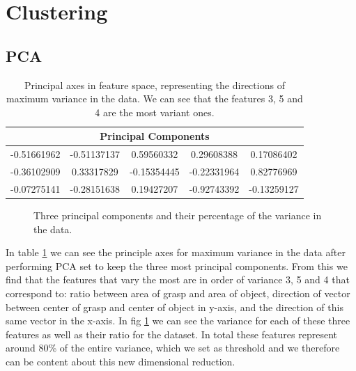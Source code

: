 %

\section{Clustering}

\subsection{PCA}

\begin{table}
	\begin{tabular}{ c c c c c }
		\hline
		\multicolumn{5}{c}{Principal Components} \\ \hline
		-0.51661962 & -0.51137137 &  0.59560332 &  0.29608388 &  0.17086402 \\ \hline
		-0.36102909 &  0.33317829 & -0.15354445 & -0.22331964 &  0.82776969 \\ \hline
		-0.07275141 & -0.28151638 &  0.19427207 & -0.92743392 & -0.13259127 \\ \hline
	\end{tabular}
	\caption{Principal axes in feature space, representing the directions of maximum variance in the data. We can see that the features 3, 5 and 4 are the most variant ones.}
	\label{tab:pca_components}
\end{table}

\begin{figure}
	
	\caption{Three principal components and their percentage of the variance in the data.}
	\label{fig:pca_variance}
\end{figure}


In table \ref{tab:pca_components} we can see the principle axes for maximum variance in the data after performing PCA set to keep the three most principal components. From this we find that the features that vary the most are in order of variance 3, 5 and 4 that correspond to: ratio between area of grasp and area of object, direction of vector between center of grasp and center of object in y-axis, and the direction of this same vector in the x-axis. In fig \ref{fig:pca_variance} we can see the variance for each of these three features as well as their ratio for the dataset. In total these features represent around 80\% of the entire variance, which we set as threshold and we therefore can be content about this new dimensional reduction.

